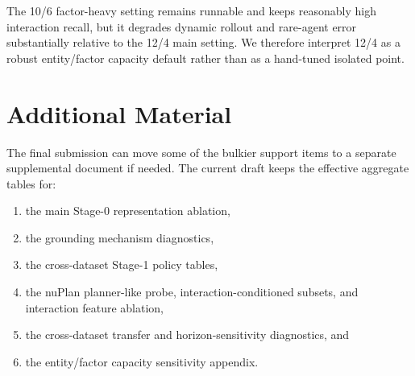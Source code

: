 \documentclass[journal]{IEEEtran}
\begin{document}
\begin{table}[!t]
\caption{Stage-0 entity/factor capacity sensitivity on nuScenes. The additional 10/6 factor-heavy point is reliable but weaker than the main 12/4 setting, supporting the claim that 12/4 is a robust default rather than an arbitrary one-off choice.}
\label{tab:appendix_budget_sensitivity}
\centering
{}
\end{table}

The 10/6 factor-heavy setting remains runnable and keeps reasonably high interaction recall, but it degrades dynamic rollout and rare-agent error substantially relative to the 12/4 main setting. We therefore interpret 12/4 as a robust entity/factor capacity default rather than as a hand-tuned isolated point.

\section{Additional Material}
The final submission can move some of the bulkier support items to a separate supplemental document if needed. The current draft keeps the effective aggregate tables for:
\begin{enumerate}
\item the main Stage-0 representation ablation,
\item the grounding mechanism diagnostics,
\item the cross-dataset Stage-1 policy tables,
\item the nuPlan planner-like probe, interaction-conditioned subsets, and interaction feature ablation,
\item the cross-dataset transfer and horizon-sensitivity diagnostics, and
\item the entity/factor capacity sensitivity appendix.
\end{enumerate}
\end{document}
